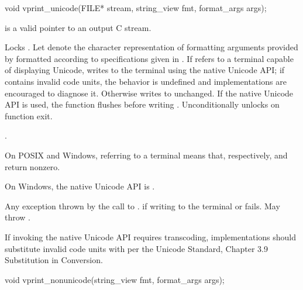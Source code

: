 %
\begin{itemdecl}
void vprint_unicode(FILE* stream, string_view fmt, format_args args);
\end{itemdecl}

\begin{itemdescr}
\pnum
\expects
{} is a valid pointer to an output C stream.

\pnum
\effects
Locks .
Let  denote the character representation of
formatting arguments provided by 
formatted according to specifications given in .
If  refers to a terminal capable of displaying Unicode,
writes  to the terminal using the native Unicode API;
if  contains invalid code units,
%
the behavior is undefined and
implementations are encouraged to diagnose it.
Otherwise writes  to  unchanged.
If the native Unicode API is used,
the function flushes  before writing .
Unconditionally unlocks  on function exit.

.

\begin{note}
On POSIX and Windows,  referring to a terminal means that,
respectively,
 and
return nonzero.
\end{note}
\begin{note}
On Windows, the native Unicode API is .
\end{note}

\pnum
\throws
Any exception thrown by the call to .
 if writing to the terminal or  fails.
May throw .

\pnum
\recommended
If invoking the native Unicode API requires transcoding,
implementations should substitute invalid code units
with  per
the Unicode Standard, Chapter 3.9  Substitution in Conversion.
\end{itemdescr}

%
\begin{itemdecl}
void vprint_nonunicode(string_view fmt, format_args args);
\end{itemdecl}

